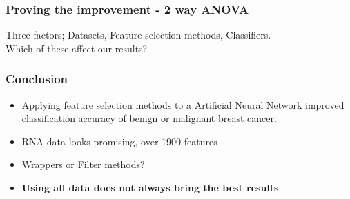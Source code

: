 \documentclass[aspectratio=1610]{beamer}
\begin{document}
\begin{frame}
  \frametitle{\hfill Proving the improvement - 2 way ANOVA}
  Three factors; Datasets, Feature selection methods, Classifiers.\\
  Which of these affect our results?\pause
  \vspace{0.02\textheight}\\
\end{frame}

\begin{frame}
  \frametitle{\hfill Conclusion}
  \begin{itemize}
  \item Applying feature selection methods to a Artificial Neural Network improved classification accuracy of benign or malignant breast cancer. \\ \pause

  \item RNA data looks promising, over 1900 features \\ \pause

  \item Wrappers or Filter methods? \\ \pause

  \item \textbf{Using all data does not always bring the best results}

  \end{itemize}
\end{frame}
\end{document}
